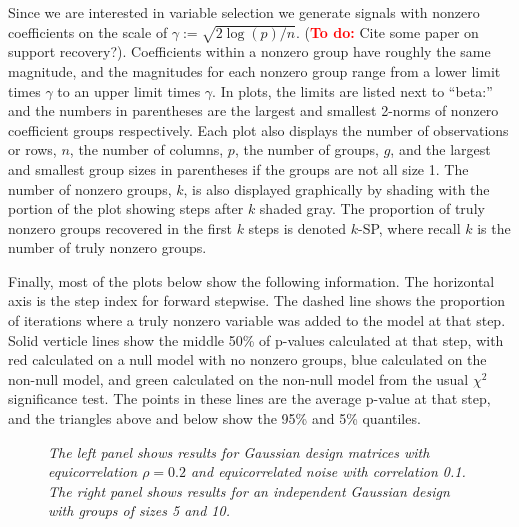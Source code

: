\documentclass{imsart}
\newcommand{\todo}{\textcolor{red}{\textbf{To do: }}}
\begin{document}
Since we are interested in variable selection we generate signals with
nonzero coefficients on the scale of $\gamma := \sqrt{2 \log(p)/n}$.
(\todo Cite some paper on support recovery?).
Coefficients within a
nonzero group have roughly the same magnitude, and the magnitudes for
each nonzero group range from a lower limit times $\gamma$ to an upper
limit times $\gamma$. In plots, the limits are listed next to ``beta:''
and the numbers in parentheses are the largest and smallest 2-norms of
nonzero coefficient groups respectively. Each plot also displays the
number of observations or rows, $n$, the number of columns, $p$, the
number of groups, $g$, and the largest and smallest group sizes in
parentheses if the groups are not all size 1. The number of nonzero
groups, $k$, is also displayed graphically by shading with the portion
of the plot showing steps after $k$ shaded gray.
The proportion of truly
nonzero groups recovered in the first $k$ steps is denoted $k$-SP,
where recall $k$ is the number of truly nonzero groups. 

Finally, most of the plots below show the following information. The
horizontal axis is the step index for forward stepwise. The dashed
line shows the proportion of iterations where a truly nonzero variable
was added to the model at that step. Solid verticle lines show the
middle 50\% of p-values calculated at that step, with red calculated
on a null model with no nonzero groups, blue calculated on the non-null
model, and green calculated on the non-null model from the usual
$\chi^2$ significance test.
The points in these lines are the average p-value at that step, and
the triangles above and below show the 95\% and 5\% quantiles.

\begin{figure}[h]
\begin{center}
\hspace{-15pt}
\caption{\small \it The left panel shows results for Gaussian design
matrices with equicorrelation $\rho=0.2$ and equicorrelated noise with
correlation 0.1. The right panel shows results for an independent
Gaussian design with groups of sizes 5 and 10.}
\end{center}
\end{figure}
\end{document}
